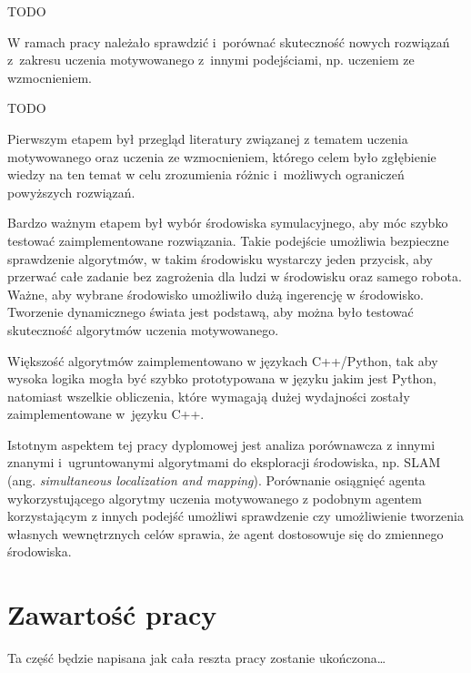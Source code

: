 TODO 

W ramach pracy należało sprawdzić i~porównać skuteczność nowych rozwiązań 
z~zakresu uczenia motywowanego z~innymi podejściami, np. uczeniem ze 
wzmocnieniem. 

TODO

Pierwszym etapem był przegląd literatury związanej z tematem uczenia 
motywowanego oraz uczenia ze wzmocnieniem, którego celem było zgłębienie wiedzy 
na ten temat w celu zrozumienia różnic i~możliwych ograniczeń powyższych 
rozwiązań. 

Bardzo ważnym etapem był wybór środowiska symulacyjnego, aby móc szybko 
testować zaimplementowane rozwiązania. Takie podejście umożliwia bezpieczne 
sprawdzenie algorytmów, w takim środowisku wystarczy jeden przycisk, aby 
przerwać całe zadanie bez zagrożenia dla ludzi w środowisku oraz samego robota. 
Ważne, aby wybrane środowisko umożliwiło dużą ingerencję w środowisko. 
Tworzenie dynamicznego świata jest podstawą, aby można było testować 
skuteczność algorytmów uczenia motywowanego.

Większość algorytmów zaimplementowano w językach C++/Python, tak aby wysoka 
logika mogła być szybko prototypowana w języku jakim jest Python, natomiast 
wszelkie obliczenia, które wymagają dużej wydajności zostały zaimplementowane 
w~języku C++. 

Istotnym aspektem tej pracy dyplomowej jest analiza porównawcza z innymi 
znanymi i~ugruntowanymi algorytmami do eksploracji środowiska, np. SLAM (ang. 
\textit{simultaneous localization and mapping}). Porównanie osiągnięć agenta 
wykorzystującego algorytmy uczenia motywowanego z podobnym agentem 
korzystającym z innych podejść umożliwi sprawdzenie czy umożliwienie tworzenia 
własnych wewnętrznych celów sprawia, że agent dostosowuje się do zmiennego 
środowiska.



\section{Zawartość pracy}
\label{sec:zawartosc_pracy}

Ta część będzie napisana jak cała reszta pracy zostanie ukończona\dots
